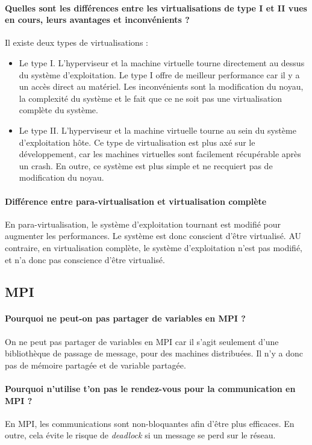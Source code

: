 \documentclass[a4paper]{article}
\begin{document}
\paragraph{Quelles sont les différences entre les virtualisations de type I et II vues en cours, leurs avantages et inconvénients ?}
Il existe deux types de virtualisations :
\begin{itemize}
\item Le type I. L'hyperviseur et la machine virtuelle tourne directement au dessus du système d'exploitation. Le type I offre de meilleur performance car il y a un accès direct au matériel. Les inconvénients sont la modification du noyau, la complexité du système et le fait que ce ne soit pas une virtualisation complète du système.
\item Le type II. L'hyperviseur et la machine virtuelle tourne au sein du système d'exploitation hôte. Ce type de virtualisation est plus axé sur le développement, car les machines virtuelles sont facilement récupérable après un crash. En outre, ce système est plus simple et ne recquiert pas de modification du noyau.
\end{itemize}

\paragraph{Différence entre para-virtualisation et virtualisation complète}
En para-virtualisation, le système d'exploitation tournant est modifié pour augmenter les performances. Le système est donc conscient d'être virtualisé. AU contraire, en virtualisation complète, le système d'exploitation n'est pas modifié, et n'a donc pas conscience d'être virtualisé.

\subsection{MPI}

\paragraph{Pourquoi ne peut-on pas partager de variables en MPI ?}
On ne peut pas partager de variables en MPI car il s'agit seulement d'une bibliothèque de passage de message, pour des machines distribuées. Il n'y a donc pas de mémoire partagée et de variable partagée.

\paragraph{Pourquoi n'utilise t'on pas le rendez-vous pour la communication en MPI ?}
En MPI, les communications sont non-bloquantes afin d'être plus efficaces. En outre, cela évite le risque de \textit{deadlock} si un message se perd sur le réseau.
\end{document}
